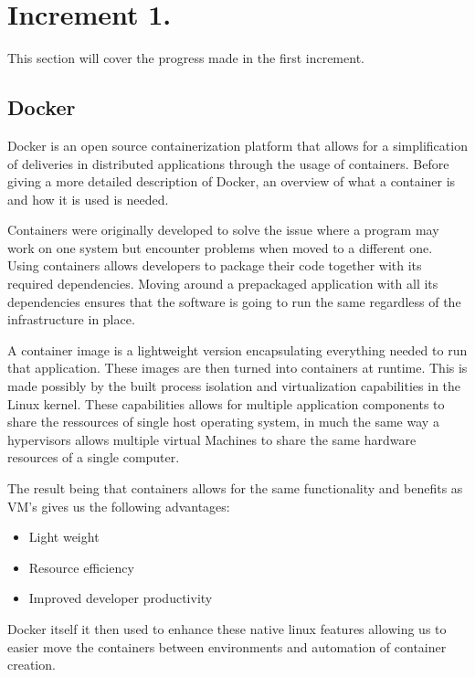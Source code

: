 \section{Increment 1.}
This section will cover the progress made in the first increment. 


\subsection{Docker}
Docker is an open source containerization platform that allows for a simplification of deliveries in distributed applications through the usage of containers. 
Before giving a more detailed description of Docker, an overview of what a container is and how it is used is needed. 


Containers were originally developed to solve the issue where a program may work on one system but encounter problems when moved to a different one. 
Using containers allows developers to package their code together with its required dependencies. 
Moving around a prepackaged application with all its dependencies ensures that the software is going to run the same regardless of the infrastructure in place. 


A container image is a lightweight version encapsulating everything needed to run that application. These images are then turned into containers at runtime. 
This is made possibly by the built process isolation and virtualization capabilities in the Linux kernel. 
These capabilities allows for multiple application components to share the ressources of single host operating system, 
in much the same way a hypervisors allows multiple virtual Machines to share the same hardware resources of a single computer. 


The result being that containers allows for the same functionality and benefits as VM’s gives us the following advantages:

\begin{itemize}
    \item Light weight 
    \item Resource efficiency
    \item Improved developer productivity
\end{itemize}

Docker itself it then used to enhance these native linux features allowing us to easier move the containers between environments and automation of container creation.

